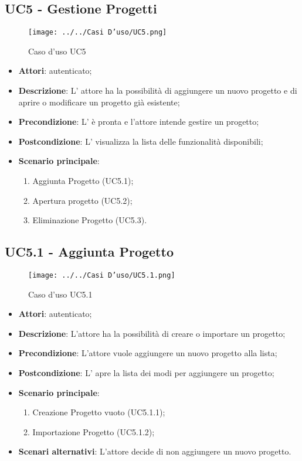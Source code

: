 \subsection{UC5 - Gestione Progetti}
\label{ssec:UC5}
\begin{figure}[h!]
\centering
\texttt{[image: ../../Casi D'uso/UC5.png]}
\caption{Caso d'uso UC5}
 \end{figure}
\begin{itemize}
\item \textbf{Attori}:  autenticato;
\item \textbf{Descrizione}: L’ attore ha la possibilità di aggiungere un nuovo progetto e di aprire o modificare un progetto già esistente;
\item \textbf{Precondizione}: L' è pronta e l'attore intende gestire un progetto;
\item \textbf{Postcondizione}: L’  visualizza la lista delle funzionalità disponibili;
\item \textbf{Scenario principale}: \begin{enumerate}\item Aggiunta Progetto (UC5.1);\item Apertura progetto (UC5.2);\item Eliminazione Progetto (UC5.3).
 \end{enumerate}
\end{itemize}
\newpage
\subsection{UC5.1 - Aggiunta Progetto}
\label{ssec:UC5.1}
\begin{figure}[h!]
\centering
\texttt{[image: ../../Casi D'uso/UC5.1.png]}
\caption{Caso d'uso UC5.1}
 \end{figure}
\begin{itemize}
\item \textbf{Attori}:  autenticato;
\item \textbf{Descrizione}: L’attore ha la possibilità di creare o importare un progetto;
\item \textbf{Precondizione}: L’attore vuole aggiungere un nuovo progetto alla lista;
\item \textbf{Postcondizione}: L’ apre la lista dei modi per aggiungere un progetto;
\item \textbf{Scenario principale}: \begin{enumerate}\item Creazione Progetto vuoto (UC5.1.1);\item Importazione Progetto (UC5.1.2);
 \end{enumerate}
\item \textbf{Scenari alternativi}: L'attore decide di non aggiungere un nuovo progetto.
\end{itemize}
